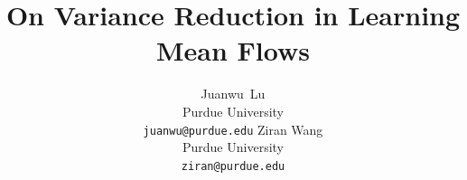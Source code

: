 \documentclass{article}
\title{On Variance Reduction in Learning Mean Flows}
\author{%
  Juanwu~Lu \\
  Purdue University \\
  \texttt{juanwu@purdue.edu}
  \And
  Ziran Wang \\
  Purdue University \\
  \texttt{ziran@purdue.edu}
}
\begin{document}
\maketitle

\begin{bibunit}[unsrt]







{%
    \small
    \putbib[references]
}
\end{bibunit}

% 

\begin{bibunit}[unsrt]

\end{bibunit}
\end{document}
